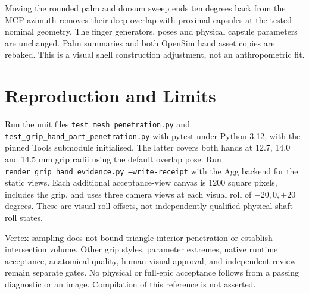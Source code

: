 \documentclass{article}
\begin{document}
Moving the rounded palm and dorsum sweep ends ten degrees back from the MCP
azimuth removes their deep overlap with proximal capsules at the tested
nominal geometry. The finger generators, poses and physical capsule parameters
are unchanged. Palm summaries and both OpenSim hand asset copies are rebaked.
This is a visual shell construction adjustment, not an anthropometric fit.
\section{Reproduction and Limits}
Run the unit files \texttt{test\_mesh\_penetration.py} and
\texttt{test\_grip\_hand\_part\_penetration.py} with pytest under Python 3.12,
with the pinned Tools submodule initialised. The latter covers both hands at
12.7, 14.0 and 14.5 mm grip radii using the default overlap pose.
Run \texttt{render\_grip\_hand\_evidence.py --write-receipt} with the Agg
backend for the static views. Each additional acceptance-view canvas is
1200 square pixels, includes the grip, and uses three camera views at each
visual roll of $-20,0,+20$ degrees. These are visual roll offsets, not
independently qualified physical shaft-roll states.

Vertex sampling does not bound triangle-interior penetration or establish
intersection volume. Other grip styles, parameter extremes, native runtime
acceptance, anatomical quality, human visual approval, and independent review
remain separate gates. No physical or full-epic acceptance follows from a
passing diagnostic or an image. Compilation of this reference is not asserted.
\end{document}
